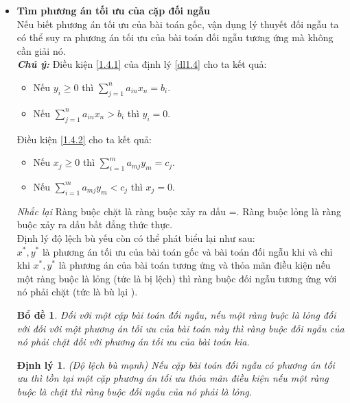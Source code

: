 \documentclass[12pt,a4paper]{report}
\newtheorem{dl}{Định lý}
\newtheorem{bd}{Bổ đề}
\newtheorem{cm}{Chứng minh}
\begin{document}
\begin{itemize}
\begin{cm}
    \end{cm}
    \item \textbf{Tìm phương án tối ưu của cặp đối ngẫu}\\
    Nếu biết phương án tối ưu của bài toán gốc, vận dụng lý thuyết đối ngẫu ta có thể suy ra phương án tối ưu của bài toán đối ngẫu tương ứng mà không cần giải nó.\\
    \textbf{\textit{Chú ý:}} Điều kiện \eqref{1.4.1} của định lý \eqref{dl1.4} cho ta kết quả:\\
    \begin{itemize}
        \item Nếu $y_i \ge 0 $ thì $\sum_{j=1}^n a_{in}x_n=b_i.$\\
        \item Nếu $\sum_{j=1}^n a_{in}x_n >b_i$ thì $y_i=0$.\\ 
    \end{itemize}
    Điều kiện \eqref{1.4.2} cho ta kết quả:\\
    \begin{itemize}
        \item Nếu $x_j \ge 0$ thì $\sum_{i=1}^m a_{mj}y_m=c_j.$\\
        \item Nếu $\sum_{i=1}^m a_{mj}y_m<c_j$ thì $x_j=0$.\\
    \end{itemize}
    \textit{Nhắc lại} Ràng buộc chặt là ràng buộc xảy ra dấu =. Ràng buộc lỏng là ràng buộc xảy ra dấu bất đẳng thức thực.\\
    Định lý độ lệch bù yếu còn có thể phát biểu lại như sau:\\
    $x^*,y^*$ là phương án tối ưu của bài toán gốc và bài toán đối ngẫu khi và chỉ khi $x^*,y^*$ là phương án của bài toán tương ứng và thỏa mãn điều kiện nếu một ràng buộc là lỏng (tức là bị lệch) thì ràng buộc đối ngẫu tương ứng với nó phải chặt (tức là bù lại ).\\
    \begin{bd}
        Đối với một cặp bài toán đối ngẫu, nếu một ràng buộc là lỏng đối với đối với một phương án tối ưu của bài toán này thì ràng buộc đối ngẫu của nó phải chặt đối với phương án tối ưu của bài toán kia.\\
    \end{bd}
    \begin{dl}
        (Độ lệch bù mạnh) Nếu cặp bài toán đối ngẫu có phương án tối ưu thì tồn tại một cặp phương án tối ưu thỏa mãn điều kiện nếu một ràng buộc là chặt thì ràng buộc đối ngẫu của nó phải là lỏng.\\

\end{dl}
\end{itemize}
\end{document}
